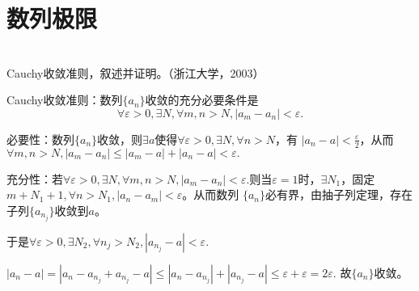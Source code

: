 \section{数列极限}
  \begin{example}
  \hfill\\
   Cauchy收敛准则，叙述并证明。（浙江大学，2003）

  Cauchy收敛准则：数列$\{a_n\}$收敛的充分必要条件是$$\forall\varepsilon>0,\exists N,\forall m,n>N,|a_m-a_n|<\varepsilon.$$
  
  必要性：数列$\{a_n\}$收敛，则$\exists a$使得$\forall\varepsilon>0,\exists N,\forall n>N$，有
  $|a_n-a|<\frac{\varepsilon}2$，从而$\forall m,n>N,|a_m-a_n|\leq|a_m-a|+|a_n-a|<\varepsilon.$
  
  充分性：若$\forall\varepsilon>0,\exists N,\forall m,n>N,|a_m-a_n|<\varepsilon.$则当$\varepsilon=1$时，$\exists N_1$，固定$m+N_1+1,\forall n>N_1,|a_n-a_m|<\varepsilon$。从而数列
  $\{a_n\}$必有界，由抽子列定理，存在子列$\{a_{n_j}\}$收敛到$a$。
  
  于是$\forall\varepsilon>0,\exists N_2,\forall n_j>N_2,|a_{n_j}-a|<\varepsilon.$
  
  $|a_n-a|=|a_n-a_{n_j}+a_{n_j}-a|\leq|a_n-a_{n_j}|+|a_{n_j}-a|\leq\varepsilon+\varepsilon=2\varepsilon.$
  故$\{a_n\}$收敛。

\end{example}

